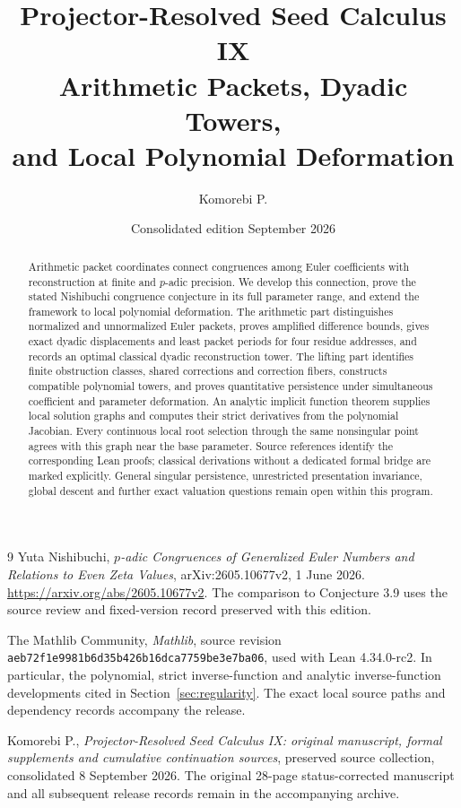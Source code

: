 \documentclass[11pt]{article}
\title{\textbf{Projector-Resolved Seed Calculus IX}\\[5pt]
  \Large Arithmetic Packets, Dyadic Towers,\\ and Local Polynomial Deformation}
\author{Komorebi P.}
\date{Consolidated edition\quad 8 September 2026}
\theoremstyle{definition}
\theoremstyle{remark}
\numberwithin{equation}{section}
\begin{document}
\maketitle
\begin{abstract}
Arithmetic packet coordinates connect congruences among Euler coefficients
with reconstruction at finite and $p$-adic precision. We develop this
connection, prove the stated Nishibuchi congruence conjecture in its full
parameter range, and extend the framework to local polynomial deformation. The arithmetic part distinguishes normalized and unnormalized
Euler packets, proves amplified difference bounds, gives exact dyadic
displacements and least packet periods for four residue addresses, and records
an optimal classical dyadic reconstruction tower. The lifting part identifies
finite obstruction classes, shared corrections and correction fibers, constructs
compatible polynomial towers, and proves quantitative persistence under
simultaneous coefficient and parameter deformation. An analytic implicit
function theorem supplies local solution graphs and computes their strict
derivatives from the polynomial Jacobian. Every continuous local root
selection through the same nonsingular point agrees with this graph near
the base parameter. Source references identify the corresponding Lean proofs;
classical derivations without a dedicated formal bridge are marked explicitly. General singular
persistence, unrestricted presentation invariance, global descent and further
exact valuation questions remain open within this program.
\end{abstract}


\clearpage
{\small\setlength{\parskip}{0pt}\tableofcontents}
\clearpage







\begin{thebibliography}{9}
Yuta Nishibuchi,
\emph{$p$-adic Congruences of Generalized Euler Numbers and Relations to Even
Zeta Values}, arXiv:2605.10677v2, 1 June 2026.
\url{https://arxiv.org/abs/2605.10677v2}.
The comparison to Conjecture 3.9 uses the source review and fixed-version
record preserved with this edition.

The Mathlib Community,
\emph{Mathlib}, source revision
\nolinkurl{aeb72f1e9981b6d35b426b16dca7759be3e7ba06},
used with Lean 4.34.0-rc2.
In particular, the polynomial, strict inverse-function and analytic
inverse-function developments cited in Section~\ref{sec:regularity}.
The exact local source paths and dependency records accompany the release.

Komorebi P.,
\emph{Projector-Resolved Seed Calculus IX: original manuscript, formal
supplements and cumulative continuation sources}, preserved source collection,
consolidated 8 September 2026.
The original 28-page status-corrected manuscript and all subsequent release
records remain in the accompanying archive.
\end{thebibliography}
\end{document}
